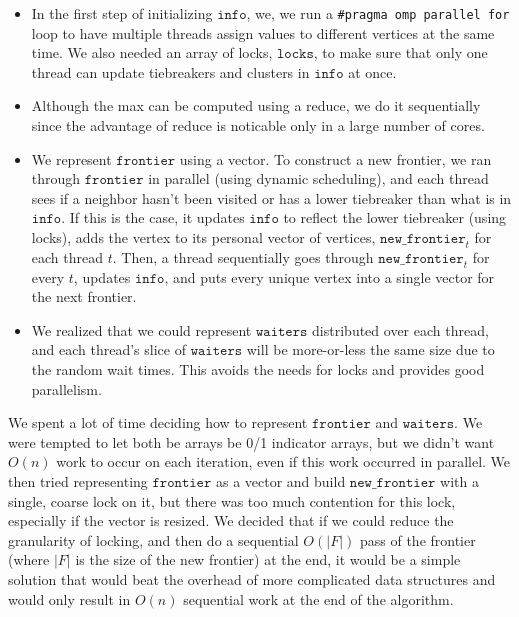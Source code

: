 \documentclass[11pt]{scrartcl}
\theoremstyle{plain}
\theoremstyle{definition}
\theoremstyle{remark}
\newcommand{\frontier}{\texttt{frontier}}
\newcommand{\info}{\texttt{info}}
\newcommand{\waiters}{\texttt{waiters}}
\begin{document}
\begin{itemize}
\item In the first step of initializing $\info$, we,
we run a \texttt{\#pragma omp parallel for} loop to
have multiple threads assign values to different vertices
at the same time. We also needed an array of locks, $\texttt{locks}$, to make sure that only one thread can update tiebreakers and clusters in $\info$ at once.

\item Although the max can be computed using a reduce, we do
it sequentially since the advantage of reduce is noticable
only in a large number of cores.

\item We represent $\frontier$ using a vector. To construct a new frontier, we ran through $\frontier$ in parallel (using dynamic scheduling), and each thread sees if a neighbor hasn't been visited or has a lower tiebreaker than what is in $\info$. If this is the case, it updates $\info$ to reflect the lower tiebreaker (using locks), adds the vertex to its personal vector of vertices, $\texttt{new\_frontier}_t$ for each thread $t$. Then, a thread sequentially goes through $\texttt{new\_frontier}_t$ for every $t$, updates $\info$, and puts every unique vertex into a single vector for the next frontier. \par
\item We realized that we could represent $\waiters$ distributed over each thread, and each thread's slice of $\waiters$ will be more-or-less the same size due to the random wait times. This avoids the needs for locks and provides good parallelism.

\end{itemize}

We spent a lot of time deciding how to represent $\frontier$ and $\waiters$. We were tempted to let both be arrays be 0/1 indicator arrays, but we didn't want $O(n)$ work to occur on each iteration, even if this work occurred in parallel. We then tried representing $\frontier$ as a vector and build $\texttt{new\_frontier}$ with a single, coarse lock on it, but there was too much contention for this lock, especially if the vector is resized. We decided that if we could reduce the granularity of locking, and then do a sequential $O(|F|)$ pass of the frontier (where $|F|$ is the size of the new frontier) at the end, it would be a simple solution that would beat the overhead of more complicated data structures and would only result in $O(n)$ sequential work at the end of the algorithm.
\end{document}
